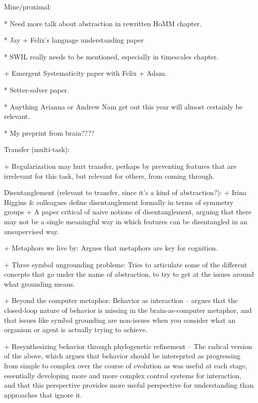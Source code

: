 Mine/proximal:

* Need more talk about abstraction in rewritten HoMM chapter.

* Jay + Felix's language understanding paper

* SWIL really needs to be mentioned, especially in timescales chapter.

+ Emergent Systematicity paper with Felix + Adam.

* Setter-solver paper.

* Anything Arianna or Andrew Nam get out this year will almost certainly be relevant.

* My preprint from brain????


Transfer (multi-task):

+ Regularization may hurt transfer, perhaps by preventing features that are irrelevant for this task, but relevant for others, from coming through. \citep{Kornblith2019} 

    Disentanglement (relevant to transfer, since it's a kind of abstraction?):
        + Irina Higgins & colleagues define disentanglement formally in terms of symmetry groups \citep{Higgins2018}
        + A paper critical of naive notions of disentanglement, arguing that there may not be a single meaningful way in which features can be disentangled in an unsupervised way. \citep{Locatello2019}

+ Metaphors we live by: Argues that metaphors are key for cognition. \citep{Lakoff2008} 

+ Three symbol ungrounding problems: Tries to articulate some of the different concepts that go under the name of abstraction, to try to get at the issues around what grounding means. \citep{Dove2016}

+ Beyond the computer metaphor: Behavior as interaction -- argues that the closed-loop nature of behavior is missing in the brain-as-computer metaphor, and that issues like symbol grounding are non-issues when you consider what an organism or agent is actually trying to achieve. \citep{Cisek1999}

+ Resynthesizing behavior through phylogenetic refinement -- The radical version of the above, which argues that behavior should be intereprted as progressing from simple to complex over the course of evolution as was useful at each stage, essentially developing more and more complex control systems for interaction, and that this perspective provides more useful perspective for understanding than approaches that ignore it. \citep{Cisek2019}

